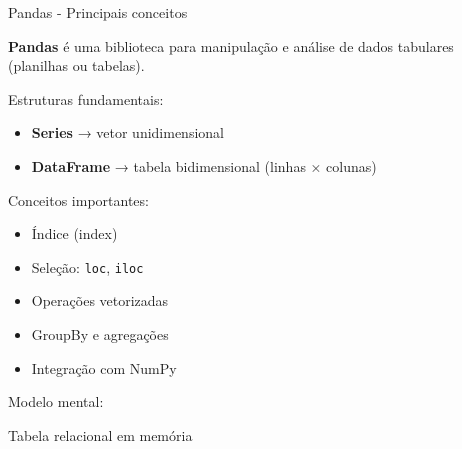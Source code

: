 \documentclass{beamer}
\begin{document}
\begin{frame}{Pandas - Principais conceitos}
    
    \textbf{Pandas} é uma biblioteca para manipulação e análise de dados tabulares (planilhas ou tabelas).
    
    \vspace{0.4cm}
    
    Estruturas fundamentais:
    
    \begin{itemize}
        \item \textbf{Series} → vetor unidimensional
        \item \textbf{DataFrame} → tabela bidimensional (linhas × colunas)
    \end{itemize}
    
    \vspace{0.4cm}
    
    Conceitos importantes:
    
    \begin{itemize}
        \item Índice (index)
        \item Seleção: \texttt{loc}, \texttt{iloc}
        \item Operações vetorizadas
        \item GroupBy e agregações
        \item Integração com NumPy
    \end{itemize}
    
    \vspace{0.4cm}
    
    Modelo mental:
    
    \begin{center}
        Tabela relacional em memória
    \end{center}
    
\end{frame}
\end{document}
